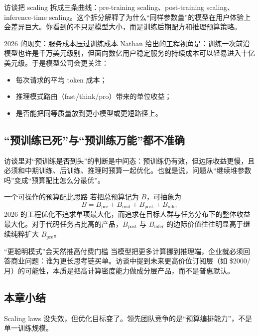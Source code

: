 \documentclass[a4paper]{article}
\begin{document}
访谈把 scaling 拆成三条曲线：pre-training scaling、post-training scaling、inference-time scaling。这个拆分解释了为什么“同样参数量”的模型在用户体验上会差异巨大。你看到的不只是模型大小，而是训练后期配方和推理预算策略。

\begin{importantbox}{2026 的现实：服务成本压过训练成本}
Nathan 给出的工程视角是：训练一次前沿模型也许是千万美元级别，但面向数亿用户稳定服务的持续成本可以轻易进入十亿美元级。于是模型公司会更关注：
\begin{itemize}[leftmargin=1.5em]
    \item 每次请求的平均 token 成本；
    \item 推理模式路由（fast/think/pro）带来的单位收益；
    \item 是否能把同等质量放到更小模型或更短路径上。
\end{itemize}
\end{importantbox}

\subsection{“预训练已死”与“预训练万能”都不准确}

访谈里对“预训练是否到头”的判断是中间态：预训练仍有效，但边际收益更慢，且必须和中期训练、后训练、推理时预算一起优化。也就是说，问题从“继续堆参数吗”变成“预算配比怎么分最优”。

\begin{knowledgebox}{一个可操作的预算配比思路}
若把总预算记为 $B$，可抽象为
\[
B = B_{\text{pre}} + B_{\text{mid}} + B_{\text{post}} + B_{\text{infer}}
\]
2026 的工程优化不追求单项最大化，而追求在目标人群与任务分布下的整体收益最大化。对于代码任务占比高的产品，$B_{\text{post}}$ 与 $B_{\text{infer}}$ 的边际价值往往明显高于继续纯粹扩大 $B_{\text{pre}}$。
\end{knowledgebox}

\begin{warningbox}{“更聪明模式”会天然推高付费门槛}
当模型把更多计算挪到推理端，企业就必须回答商业问题：谁为更长思考链买单。访谈中提到未来更高价位订阅层（如 \$2000/月）的可能性，本质是把高计算密度能力做成分层产品，而不是普惠默认。
\end{warningbox}

\subsection{本章小结}

Scaling laws 没失效，但优化目标变了。领先团队竞争的是“预算编排能力”，不是单一训练规模。
\end{document}
